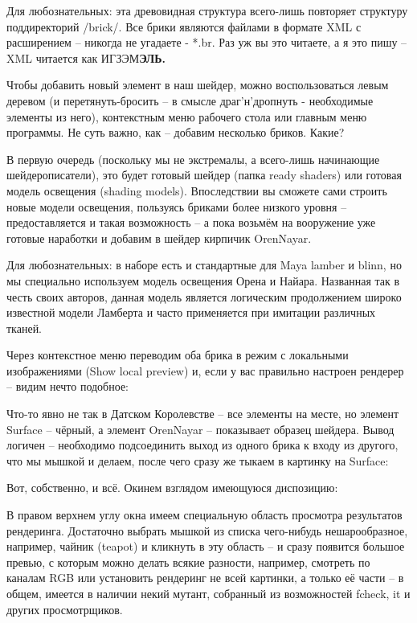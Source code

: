  Для
    любознательных: эта древовидная
    структура всего-лишь повторяет структуру поддиректорий /brick/. Все
    брики являются файлами в формате XML с расширением – никогда не
    угадаете - *.br. Раз уж вы это читаете, а я это пишу – XML читается
    как ИГЗЭМ{\bf ЭЛЬ.}
  

 Чтобы добавить новый элемент в наш шейдер, можно
    воспользоваться левым деревом (и перетянуть-бросить – в смысле
    драг’н’дропнуть - необходимые элементы из него), контекстным меню
    рабочего стола или главным меню программы. Не суть важно, как –
    добавим несколько бриков. Какие?
  

 В первую очередь (поскольку мы не экстремалы, а
    всего-лишь начинающие шейдерописатели), это будет готовый шейдер
    (папка ready shaders) или готовая модель освещения (shading
    models). Впоследствии вы сможете сами строить новые модели
    освещения, пользуясь бриками более низкого уровня – предоставляется
    и такая возможность – а пока возьмём на вооружение уже готовые
    наработки и добавим в шейдер кирпичик OrenNayar.
  

  

 Для
    любознательных: в наборе есть и
    стандартные для Maya lamber и blinn, но мы специально используем
    модель освещения Орена и Найара. Названная так в честь своих
    авторов, данная модель является логическим продолжением широко
    известной модели Ламберта и часто применяется при имитации
    различных тканей.
  

 Через контекстное меню переводим оба брика в режим
    с локальными изображениями (Show local preview) и, если у вас
    правильно настроен рендерер – видим нечто подобное:
  

  

 Что-то явно не так в Датском Королевстве – все
    элементы на месте, но элемент Surface – чёрный, а элемент OrenNayar
    – показывает образец шейдера. Вывод логичен – необходимо
    подсоединить выход из одного брика к входу из другого, что мы
    мышкой и делаем, после чего сразу же тыкаем в картинку на
    Surface:
  

  

 Вот, собственно, и всё. Окинем взглядом имеющуюся
    диспозицию:
  

  

 В правом верхнем углу окна имеем специальную
    область просмотра результатов рендеринга. Достаточно выбрать мышкой
    из списка чего-нибудь нешарообразное, например, чайник (teapot) и
    кликнуть в эту область – и сразу появится большое превью, с которым
    можно делать всякие разности, например, смотреть по каналам RGB или
    установить рендеринг не всей картинки, а только её части – в общем,
    имеется в наличии некий мутант, собранный из возможностей fcheck,
    it и других просмотрщиков.
  

